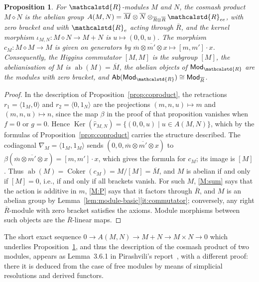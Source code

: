\documentclass[reqno,a4paper]{amsart}
\theoremstyle{plain}
\newtheorem{proposition}[subsection]{Proposition}
\theoremstyle{definition}
\newcommand{\R}{\ensuremath{\mathcalstd{R}}}
\newcommand{\Ab}{\ensuremath{\mathsf{Ab}}}
\newcommand{\Mod}{\ensuremath{\mathsf{Mod}}}
\DeclareMathOperator{\ab}{ab}
\DeclareMathOperator{\Ker}{Ker}
\DeclareMathOperator{\Coker}{Coker}
\newcommand{\cosmash}{\ensuremath{\diamond}}
\newcommand{\cm}[2]{\ensuremath{\hat{r}_{#1,#2}}}          %
\newcommand{\cc}[1]{\ensuremath{c_{#1}}}                    %
\newcommand{\fold}[1]{\ensuremath{\nabla_{#1}}}            %
\renewcommand{\Re}{\ensuremath{\R_{e}}}
\newcommand{\Ree}{\ensuremath{\R_{ee}}}
\newcommand{\Rbar}{\ensuremath{\overline{R}}}
\newcommand{\brk}[2]{\ensuremath{[#1,#2]}}
\begin{document}
\begin{proposition}\label{prop:cosmash-mod}
  For \(\R\)-modules \(M\) and \(N\), the cosmash product \(M\cosmash N\) is the abelian group \(A(M,N)=\overline{M}\otimes\overline{N}\otimes_{\Rbar\otimes\Rbar}\Ree\), with zero bracket and with \(\Re\) acting through \(\Rbar\), and the kernel morphism \(\iota_{M,N}\colon M\cosmash N\to M+N\) is \(u\mapsto(0,0,u)\). The morphism \(\cc{M}\colon M\cosmash M\to M\) is given on generators by \(\overline{m}\otimes\overline{m'}\otimes x\mapsto\brk{m}{m'}\cdot x\). Consequently, the Higgins commutator \([M,M]\) is the subgroup \([M]\), the abelianisation of \(M\) is \(\ab(M)=\overline{M}\), the abelian objects of \(\Mod_{\R}\) are the modules with zero bracket, and \(\Ab(\Mod_{\R})\cong\Mod_{\Rbar}\).
\end{proposition}

\begin{proof}
  In the description of Proposition~\ref{prop:coproduct}, the retractions \(r_{1}=\langle 1_{M},0\rangle\) and \(r_{2}=\langle 0,1_{N}\rangle\) are the projections \((m,n,u)\mapsto m\) and \((m,n,u)\mapsto n\), since the map \(\beta\) in the proof of that proposition vanishes when \(f=0\) or \(g=0\). Hence \(\Ker(\cm{M}{N})=\{(0,0,u)\mid u\in A(M,N)\}\), which by the formulas of Proposition~\ref{prop:coproduct} carries the structure described. The codiagonal \(\fold{M}=\langle 1_{M},1_{M}\rangle\) sends \((0,0,\overline{m}\otimes\overline{m'}\otimes x)\) to \(\beta(\overline{m}\otimes\overline{m'}\otimes x)=\brk{m}{m'}\cdot x\), which gives the formula for \(\cc{M}\); its image is \([M]\). Thus \(\ab(M)=\Coker(\cc{M})=M/[M]=\overline{M}\), and \(M\) is abelian if and only if \([M]=0\), i.e., if and only if all brackets vanish. For such \(M\), \ref{M:sum} says that the action is additive in \(m\), \ref{M:P} says that it factors through \(\Rbar\), and \(M\) is an abelian group by Lemma~\ref{lem:module-basic}\ref{it:commutator}; conversely, any right \(\Rbar\)-module with zero bracket satisfies the axioms. Module morphisms between such objects are the \(\Rbar\)-linear maps.
\end{proof}

The short exact sequence \(0\to A(M,N)\to M+N\to M\times N\to 0\) which underlies Proposition~\ref{prop:cosmash-mod}, and thus the description of the cosmash product of two modules, appears as Lemma~3.6.1 in Pirashvili's report~\cite{Pirashvili-Square-Rings}, with a different proof: there it is deduced from the case of free modules by means of simplicial resolutions and derived functors.
\end{document}
